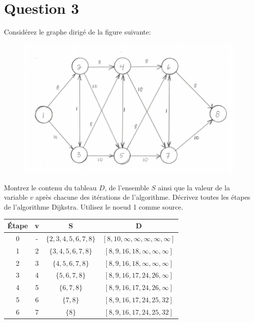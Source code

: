\documentclass[12pt]{article}
\begin{document}
\section*{Question 3}
Considérez le graphe dirigé de la figure suivante:

\begin{figure}[H]
	\centering
	\includegraphics[width=12cm]{q3}
\end{figure}

Montrez le contenu du tableau \(D\), de l’ensemble \(S\) ainsi que la valeur de la variable \(v\) après chacune des itérations de l’algorithme. Décrivez toutes les étapes de l’algorithme Dijkstra. Utilisez le noeud 1 comme source. \\

\begin{table}[H]
\centering
\begin{tabular}{c|ccc}
Étape     & v & S                                  & D \\ \hline
    0     & - &  \(\lbrace 2,3,4,5,6,7,8 \rbrace\)   & \([8,10,\infty,\infty,\infty,\infty,\infty]\)  \\
    1     & 2 &  \(\lbrace 3,4,5,6,7,8 \rbrace\)     & \([8,9,16,18,\infty,\infty,\infty]\)  \\
    2     & 3 &  \(\lbrace 4,5,6,7,8 \rbrace\)       & \([8,9,16,18,\infty,\infty,\infty]\)  \\ 
    3     & 4 &  \(\lbrace 5,6,7,8 \rbrace\)         & \([8,9,16,17,24,26,\infty]\)  \\
    4     & 5 &  \(\lbrace 6,7,8 \rbrace\)           & \([8,9,16,17,24,26,\infty]\)  \\
    5     & 6 &  \(\lbrace 7,8 \rbrace\)   		     & \([8,9,16,17,24,25,32]\)  \\
    6     & 7 &  \(\lbrace 8 \rbrace\)   			 & \([8,9,16,17,24,25,32]\)  \\
\end{tabular}
\end{table}
\end{document}
